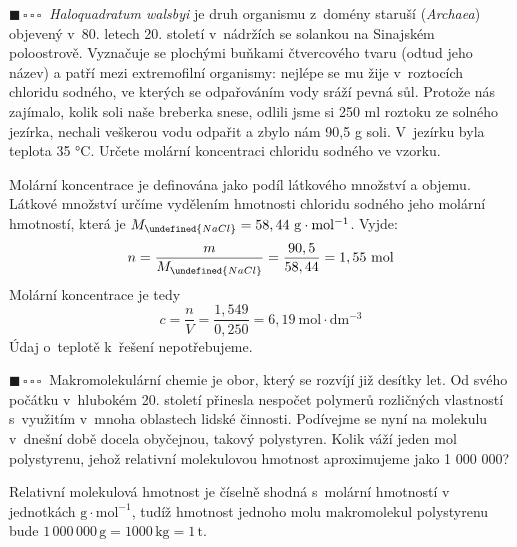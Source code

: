 \documentclass{book}
\let\ch\undefined
\newcommand{\jeden}{$\blacksquare \, \square \, \square \, \square \; \; $}
\renewenvironment{quotation}{\par}{\par} %
\begin{document}
\hrulefill %
\begin{quotation}
\jeden \textit{Haloquadratum walsbyi} je druh organismu z~domény staruší
(\textit{Archaea}) objevený v~80. letech 20. století v~nádržích
se solankou na Sinajském poloostrově. Vyznačuje se plochými buňkami
čtvercového tvaru (odtud jeho název) a patří mezi extremofilní organismy:
nejlépe se mu žije v~roztocích chloridu sodného, ve kterých se odpařováním
vody sráží pevná sůl. Protože nás zajímalo, kolik soli naše breberka
snese, odlili jsme si 250 ml roztoku ze solného jezírka, nechali veškerou
vodu odpařit a zbylo nám 90,5 g soli. V~jezírku byla teplota 35 °C.
Určete molární koncentraci chloridu sodného ve vzorku.
\end{quotation} \dotfill \par 
Molární koncentrace je definována jako podíl látkového množství a
objemu. Látkové množství určíme vydělením hmotnosti chloridu sodného
jeho molární hmotností, která je $M_{\ch{NaCl}}=58,44\ \mathrm{g\cdot mol^{-1}}$.
Vyjde:
\[
 n=\frac{m}{M_{\ch{NaCl}}}=\frac{90,5}{58,44}=1,55\ \mathrm{mol}
\]
Molární koncentrace je tedy 
\[
c=\frac{n}{V}=\frac{1,549}{0,250}=6,19\ \mathrm{mol\cdot dm^{-3}}
\]
Údaj o~teplotě k~řešení nepotřebujeme.

\hrulefill %
\begin{quotation}
\jeden Makromolekulární chemie je obor, který se rozvíjí již desítky let. Od svého počátku v~hlubokém 20. století přinesla nespočet polymerů rozličných vlastností s~využitím v~mnoha oblastech lidské činnosti.
Podívejme se nyní na molekulu v~dnešní době docela obyčejnou, takový polystyren.
Kolik váží jeden mol polystyrenu, jehož relativní molekulovou hmotnost aproximujeme jako 1 000 000? 
\end{quotation} \dotfill \par 
Relativní molekulová hmotnost je číselně shodná s~molární hmotností
v jednotkách $\mathrm{g\cdot mol^{-1}}$, tudíž hmotnost jednoho molu makromolekul polystyrenu
bude $1\, 000\, 000\, \mathrm{g}=1000\, \mathrm{kg}=1\, \mathrm{t}.$

\newpage %
\end{document}
